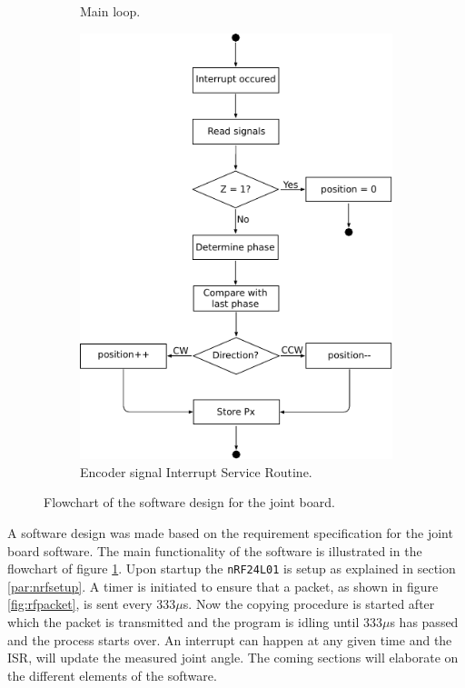 \begin{figure}[h]
\begin{subfigure}[b]{0.30\textwidth}
		\caption{Main loop.}
		\label{sfig:joint_main_flowchart}
	\end{subfigure}
	\begin{subfigure}[b]{0.69\textwidth}
		\centering
		\includegraphics[width=.8\linewidth]{graphics/joint_interrupt}
		\caption{Encoder signal Interrupt Service Routine.}
		\label{sfig:joint_interrupt}
	\end{subfigure}
	\caption{Flowchart of the software design for the joint board.}
	\label{fig:joint_software}
\end{figure}
A software design was made based on the requirement specification for the joint board software.
The main functionality of the software is illustrated in the flowchart of figure \ref{sfig:joint_main_flowchart}.
Upon startup the \texttt{nRF24L01} is setup as explained in section \ref{par:nrfsetup}.
A timer is initiated to ensure that a packet, as shown in figure \ref{fig:rfpacket}, is sent every 333$\mu$s.
Now the copying procedure is started after which the packet is transmitted and the program is idling until 333$\mu$s has passed and the process starts over.
An interrupt can happen at any given time and the ISR, will update the measured joint angle. 
The coming sections will elaborate on the different elements of the software.

